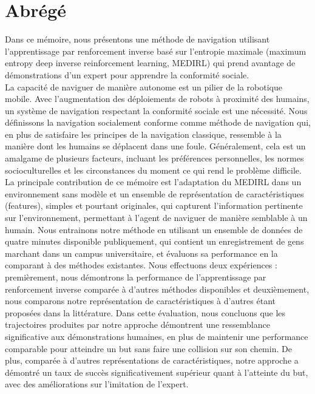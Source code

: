 \chapter*{\rm\bfseries Abr\'eg\'e}
Dans ce m\'emoire, nous pr\'esentons une m\'ethode de navigation utilisant l'apprentissage par renforcement inverse bas\'e sur l'entropie maximale (maximum entropy deep inverse reinforcement learning, MEDIRL) qui prend avantage de d\'emonstrations d'un expert pour apprendre la conformit\'e sociale.\\
La capacit\'e de naviguer de mani\`ere autonome est un pilier de la robotique mobile. Avec l'augmentation des d\'eploiements de robots \`a proximit\'e des humains, un syst\`eme de navigation respectant la conformit\'e sociale est une n\'ecessit\'e. Nous d\'efinissons la navigation socialement conforme comme m\'ethode de navigation qui, en plus de satisfaire les principes de la navigation classique, ressemble \`a la mani\`ere dont les humains se d\'eplacent dans une foule. G\'en\'eralement, cela est un amalgame de plusieurs facteurs, incluant les pr\'ef\'erences personnelles, les normes socioculturelles et les circonstances du moment ce qui rend le probl\`eme difficile.\\
La principale contribution de ce m\'emoire est l'adaptation du MEDIRL dans un environnement sans mod\`ele et un ensemble de repr\'esentation de caract\'eristiques (features), simples et pourtant originales, qui capturent l'information pertinente sur l'environnement, permettant \`a l'agent de naviguer de mani\`ere semblable \`a un humain. Nous entrainons notre m\'ethode en utilisant un ensemble de donn\'ees de quatre minutes disponible publiquement, qui contient un enregistrement de gens marchant dans un campus universitaire, et \'evaluons sa performance en la comparant \`a des m\'ethodes existantes. Nous effectuons deux exp\'eriences : premi\`erement, nous d\'emontrons la performance de l'apprentissage par renforcement inverse compar\'ee \`a d'autres m\'ethodes disponibles et deuxi\`emement, nous comparons notre repr\'esentation de caract\'eristiques \`a d'autres \'etant propos\'ees dans la litt\'erature. Dans cette \'evaluation, nous concluons que les trajectoires produites par notre approche d\'emontrent une ressemblance significative aux d\'emonstrations humaines, en plus de maintenir une performance comparable pour atteindre un but sans faire une collision sur son chemin. De plus, compar\'ee \`a d'autres repr\'esentations de caract\'eristiques, notre approche a d\'emontr\'e un taux de succ\`es significativement sup\'erieur quant \`a l'atteinte du but, avec des am\'eliorations sur l'imitation de l'expert.